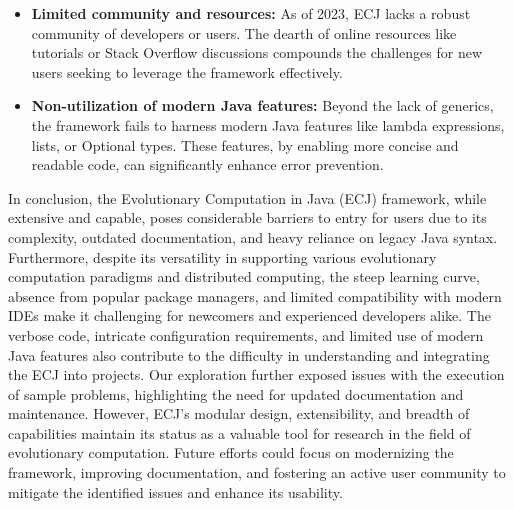 \begin{itemize}
  \item \textbf{Limited community and resources:} As of 2023, ECJ lacks a robust community of developers or users. The dearth of online resources like tutorials or Stack Overflow discussions compounds the challenges for new users seeking to leverage the framework effectively.

  \item \textbf{Non-utilization of modern Java features:} Beyond the lack of generics, the framework fails to harness modern Java features like lambda expressions, lists, or Optional types. These features, by enabling more concise and readable code, can significantly enhance error prevention.
\end{itemize}

In conclusion, the Evolutionary Computation in Java (ECJ) framework, while extensive and capable, poses considerable barriers to entry for users due to its complexity, outdated documentation, and heavy reliance on legacy Java syntax. Furthermore, despite its versatility in supporting various evolutionary computation paradigms and distributed computing, the steep learning curve, absence from popular package managers, and limited compatibility with modern IDEs make it challenging for newcomers and experienced developers alike. The verbose code, intricate configuration requirements, and limited use of modern Java features also contribute to the difficulty in understanding and integrating the ECJ into projects. Our exploration further exposed issues with the execution of sample problems, highlighting the need for updated documentation and maintenance. However, ECJ's modular design, extensibility, and breadth of capabilities maintain its status as a valuable tool for research in the field of evolutionary computation. Future efforts could focus on modernizing the framework, improving documentation, and fostering an active user community to mitigate the identified issues and enhance its usability.
